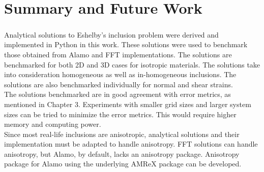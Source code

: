 \documentclass[12pt, a4paper]{report}
\begin{document}
\chapter{Summary and Future Work}
\paragraph{}
Analytical solutions to Eshelby's inclusion problem were derived and implemented in Python in this work. These solutions were used to benchmark those obtained from Alamo and FFT implementations. The solutions are benchmarked for both 2D and 3D cases for isotropic materials. The solutions take into consideration homogeneous as well as in-homogeneous inclusions. The solutions are also benchmarked individually for normal and shear strains. \\

The solutions benchmarked are in good agreement with error metrics, as mentioned in Chapter 3. Experiments with smaller grid sizes and larger system sizes can be tried to minimize the error metrics. This would require higher memory and computing power. \\

Since most real-life inclusions are anisotropic, analytical solutions and their implementation must be adapted to handle anisotropy. FFT solutions can handle anisotropy, but Alamo, by default, lacks an anisotropy package. Anisotropy package for Alamo using the underlying AMReX package can be developed.


\end{document}
